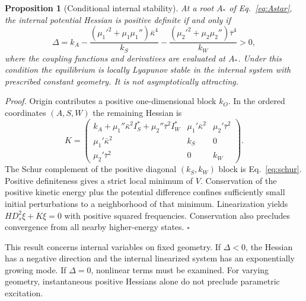 \documentclass[11pt]{article}
\newcommand{\Ds}{D_s}
\newtheorem{proposition}{Proposition}
\begin{document}
\begin{proposition}[Conditional internal stability]
At a root $A_*$ of Eq.~\eqref{eq:Astar}, the internal potential Hessian is positive definite if and only if
\begin{equation}
 \Delta=k_A-
 \frac{(\mu_1'^2+\mu_1\mu_1'')\bar\kappa^4}{k_S}
 -\frac{(\mu_2'^2+\mu_2\mu_2'')\bar\tau^4}{k_W}>0,
 \label{eq:schur}
\end{equation}
where the coupling functions and derivatives are evaluated at $A_*$. Under this condition the equilibrium is locally Lyapunov stable in the internal system with prescribed constant geometry. It is not asymptotically attracting.
\end{proposition}
\textit{Proof.} Origin contributes a positive one-dimensional block $k_O$. In the ordered coordinates $(A,S,W)$ the remaining Hessian is
\begin{equation}
 K=\begin{pmatrix}
 k_A+\mu_1''\bar\kappa^2I_S^*+\mu_2''\bar\tau^2I_W^*&\mu_1'\bar\kappa^2&\mu_2'\bar\tau^2\\
 \mu_1'\bar\kappa^2&k_S&0\\
 \mu_2'\bar\tau^2&0&k_W
 \end{pmatrix}.
\end{equation}
The Schur complement of the positive diagonal $(k_S,k_W)$ block is Eq.~\eqref{eq:schur}. Positive definiteness gives a strict local minimum of $V$. Conservation of the positive kinetic energy plus the potential difference confines sufficiently small initial perturbations to a neighborhood of that minimum. Linearization yields $H\Ds^2\xi+K\xi=0$ with positive squared frequencies. Conservation also precludes convergence from all nearby higher-energy states. $\square$

This result concerns internal variables on fixed geometry. If $\Delta<0$, the Hessian has a negative direction and the internal linearized system has an exponentially growing mode. If $\Delta=0$, nonlinear terms must be examined. For varying geometry, instantaneous positive Hessians alone do not preclude parametric excitation.
\end{document}

